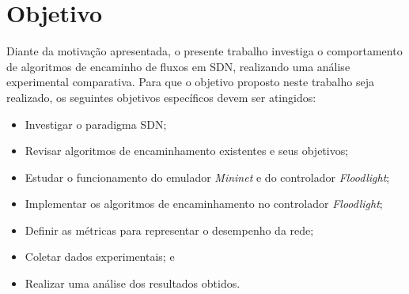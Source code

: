 \section{Objetivo}
\label{sec:objetivo}
Diante da motivação apresentada, o presente trabalho investiga o comportamento de algoritmos de encaminho de fluxos em SDN, realizando uma análise experimental comparativa. Para que o objetivo proposto neste trabalho seja realizado, os seguintes objetivos específicos devem ser atingidos:
\begin{itemize}
    \item Investigar o paradigma SDN;
    \item Revisar algoritmos de encaminhamento existentes e seus objetivos;
    \item Estudar o funcionamento do emulador  \textit{Mininet} e do controlador \textit{Floodlight};
    \item Implementar os algoritmos de encaminhamento no controlador \textit{Floodlight};
    \item Definir as métricas para representar o desempenho da rede;
    \item Coletar dados experimentais; e
    \item Realizar uma análise dos resultados obtidos.
    
\end{itemize}


